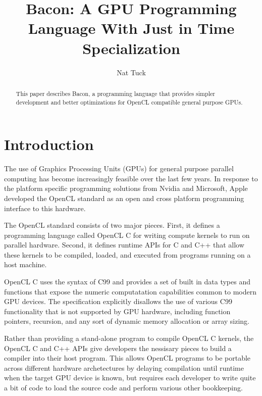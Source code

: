 \documentclass{llncs}
\begin{document}
\title{Bacon: A GPU Programming Language With Just in Time Specialization}

\author{Nat Tuck}


\maketitle

\begin{abstract}

This paper describes Bacon, a programming language that provides
simpler development and better optimizations for OpenCL compatible
general purpose GPUs.

\end{abstract}

\section{Introduction}

The use of Graphics Processing Units (GPUs) for general purpose
parallel computing has become increasingly feasible over the last few
years. In response to the platform specific programming solutions from
Nvidia and Microsoft, Apple developed the OpenCL standard as an open and
cross platform programming interface to this hardware.

The OpenCL standard consists of two major pieces. First, it defines a
programming language called OpenCL C for writing compute kernels to
run on parallel hardware. Second, it defines runtime APIs for C and
C++ that allow these kernels to be compiled, loaded, and executed from
programs running on a host machine.

OpenCL C uses the syntax of C99 and provides a set of built in data
types and functions that expose the numeric computatation capabilities
common to modern GPU devices. The specification explicitly disallows
the use of various C99 functionality that is not supported by GPU
hardware, including function pointers, recursion, and any sort of
dynamic memory allocation or array sizing. 

Rather than providing a stand-alone program to compile OpenCL C
kernels, the OpenCL C and C++ APIs give developers the nessisary
pieces to build a compiler into their host program. This allows OpenCL
programs to be portable across different hardware archetectures by
delaying compilation until runtime when the target GPU device is
known, but requires each developer to write quite a bit of code to
load the source code and perform various other bookkeeping.
\end{document}
